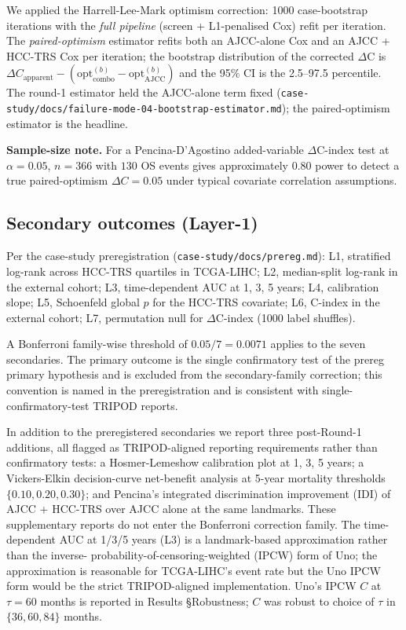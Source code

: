 \documentclass[12pt]{article}
\newcommand{\HCCRTS}{HCC-TRS\xspace}
\begin{document}
We applied the Harrell-Lee-Mark optimism
correction\citep{harrell1996multivariable}: 1000 case-bootstrap
iterations with the \emph{full pipeline} (screen + L1-penalised Cox)
refit per iteration. The \emph{paired-optimism} estimator refits both
an AJCC-alone Cox and an AJCC + \HCCRTS Cox per iteration; the
bootstrap distribution of the corrected $\Delta$C is
$\Delta C_{\text{apparent}} - (\text{opt}_{\text{combo}}^{(b)}
- \text{opt}_{\text{AJCC}}^{(b)})$ and the 95\% CI is the 2.5--97.5
percentile. The round-1 estimator held the AJCC-alone term fixed
(\texttt{case-study/docs/failure-mode-04-bootstrap-estimator.md});
the paired-optimism estimator is the headline.

\textbf{Sample-size note.} For a Pencina-D'Agostino added-variable
$\Delta$C-index test at $\alpha = 0.05$, $n = 366$ with $130$ OS events
gives approximately $0.80$ power to detect a true paired-optimism
$\Delta C = 0.05$ under typical covariate correlation
assumptions.\citep{pencina2012evaluating}

\subsection{Secondary outcomes (Layer-1)}

Per the case-study preregistration (\texttt{case-study/docs/prereg.md}):
L1, stratified log-rank across HCC-TRS quartiles in TCGA-LIHC; L2,
median-split log-rank in the external cohort; L3, time-dependent AUC
at 1, 3, 5 years; L4, calibration slope; L5, Schoenfeld global $p$
for the HCC-TRS covariate; L6, C-index in the external cohort; L7,
permutation null for $\Delta$C-index (1000 label shuffles).

A Bonferroni family-wise threshold of $0.05/7 = 0.0071$ applies to
the seven secondaries. The primary outcome is the single confirmatory
test of the prereg primary hypothesis and is excluded from the
secondary-family correction; this convention is named in the
preregistration and is consistent with single-confirmatory-test
TRIPOD reports.

In addition to the preregistered secondaries we report three
post-Round-1 additions, all flagged as TRIPOD-aligned reporting
requirements rather than confirmatory tests: a Hosmer-Lemeshow
calibration plot at 1, 3, 5 years; a Vickers-Elkin decision-curve
net-benefit analysis at 5-year mortality thresholds
$\{0.10, 0.20, 0.30\}$\citep{vickers2006decision,vickers2019simple};
and Pencina's integrated discrimination improvement
(IDI)\citep{pencina2008evaluating} of AJCC + \HCCRTS over AJCC alone
at the same landmarks. These supplementary reports do not enter the
Bonferroni correction family. The time-dependent AUC at 1/3/5 years
(L3) is a landmark-based approximation rather than the inverse-
probability-of-censoring-weighted (IPCW) form of Uno\citep{uno2011c};
the approximation is reasonable for TCGA-LIHC's event rate but the
Uno IPCW form would be the strict TRIPOD-aligned implementation.
Uno's IPCW $C$ at $\tau = 60$ months is reported in Results
§Robustness; $C$ was robust to choice of $\tau$ in $\{36, 60, 84\}$
months.
\end{document}
